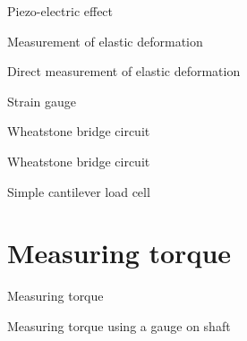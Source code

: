 \documentclass[compress]{beamer}
\begin{document}
{
\begin{frame}{Piezo-electric effect}

\pnote{
}
\end{frame}
}

{
\begin{frame}{Measurement of elastic deformation}

\pnote{
}
\end{frame}
}

{
\begin{frame}{Direct measurement of elastic deformation}

\pnote{
}
\end{frame}
}

{
\begin{frame}{Strain gauge}

\pnote{
}
\end{frame}
}

{
\begin{frame}{Wheatstone bridge circuit}

\pnote{
}
\end{frame}
}

{
\begin{frame}{Wheatstone bridge circuit}

\pnote{
}
\end{frame}
}

{
\begin{frame}{Simple cantilever load cell}

\pnote{
}
\end{frame}
}

\section{Measuring torque}

{
\begin{frame}{Measuring torque}

\pnote{
}
\end{frame}
}

{
\begin{frame}{Measuring torque using a gauge on shaft}

\pnote{
}
\end{frame}
}
\end{document}
